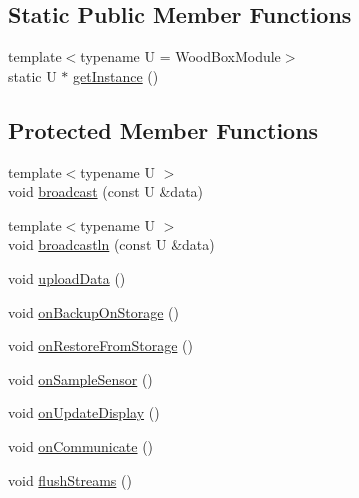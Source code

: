 \subsection*{Static Public Member Functions}
\begin{DoxyCompactItemize}
\item 
{\footnotesize template$<$typename U  = Wood\+Box\+Module$>$ }\\static U $\ast$ \mbox{\hyperlink{classwood_box_1_1module_1_1_wood_box_module_a3f13bd3a6318ddf2a7db84f86b198a49}{get\+Instance}} ()
\end{DoxyCompactItemize}
\subsection*{Protected Member Functions}
\begin{DoxyCompactItemize}
\item 
{\footnotesize template$<$typename U $>$ }\\void \mbox{\hyperlink{classwood_box_1_1module_1_1_wood_box_module_ac481cbb3ee83f192218a5943c59d74fe}{broadcast}} (const U \&data)
\item 
{\footnotesize template$<$typename U $>$ }\\void \mbox{\hyperlink{classwood_box_1_1module_1_1_wood_box_module_a5329c737b0a102851782b5d2a6019bc8}{broadcastln}} (const U \&data)
\item 
void \mbox{\hyperlink{classwood_box_1_1module_1_1_wood_box_module_a4fa136e3e3f29c71d12a8163b4c5a765}{upload\+Data}} ()
\item 
void \mbox{\hyperlink{classwood_box_1_1module_1_1_wood_box_module_a28c9b89bc3429d6e78fa38698c78d553}{on\+Backup\+On\+Storage}} ()
\item 
void \mbox{\hyperlink{classwood_box_1_1module_1_1_wood_box_module_a89395caa73cadc63c576931b45400c2d}{on\+Restore\+From\+Storage}} ()
\item 
void \mbox{\hyperlink{classwood_box_1_1module_1_1_wood_box_module_a227e8b23e8435f622f4d59eb6847e98b}{on\+Sample\+Sensor}} ()
\item 
void \mbox{\hyperlink{classwood_box_1_1module_1_1_wood_box_module_a1461bd1a53529065541c87fc03a28f57}{on\+Update\+Display}} ()
\item 
void \mbox{\hyperlink{classwood_box_1_1module_1_1_wood_box_module_acacb4ac748c70bd1f172d9a87e07dfbf}{on\+Communicate}} ()
\item 
void \mbox{\hyperlink{classwood_box_1_1module_1_1_wood_box_module_a240ad6ff3f905a531fcc62670a26a6fa}{flush\+Streams}} ()
\end{DoxyCompactItemize}
